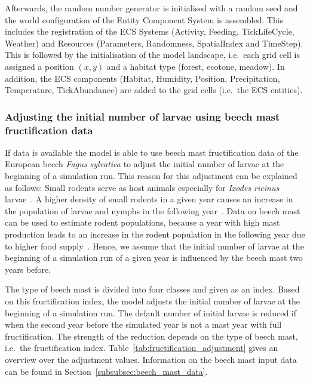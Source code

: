 \documentclass[a4paper, 11pt]{scrartcl}
\begin{document}
Afterwards, the random number generator is initialised with a random seed and the world configuration of the Entity Component System is assembled. This includes the registration of the ECS Systems (Activity, Feeding, TickLifeCycle, Weather) and Resources (Parameters, Randomness, SpatialIndex and TimeStep). This is followed by the initialisation of the model landscape, i.e.\ each grid cell is assigned a position $(x, y)$ and a habitat type (forest, ecotone, meadow). In addition, the ECS components (Habitat, Humidity, Position, Precipitation, Temperature, TickAbundance) are added to the grid cells (i.e.\ the ECS entities).

\subsubsection{Adjusting the initial number of larvae using beech mast fructification data}\label{subsubsec:initial_larvae_with_beech_mast}
If data is available the model is able to use beech mast fructification data of the European beech \textit{Fagus sylvatica} to adjust the initial number of larvae at the beginning of a simulation run. This reason for this adjustment can be explained as follows: Small rodents serve as host animals especially for \textit{Ixodes ricinus} larvae~\parencite{Cayol.2017}. A higher density of small rodents in a given year causes an increase in the population of larvae and nymphs in the following year~\parencite{Brugger.2018}. Data on beech mast can be used to estimate rodent populations, because a year with high mast production leads to an increase in the rodent population in the following year due to higher food supply~\parencite{Clement.2009}. Hence, we assume that the initial number of larvae at the beginning of a simulation run of a given year is influenced by the beech mast two years before.

The type of beech mast is divided into four classes and given as an index. Based on this fructification index, the model adjusts the initial number of larvae at the beginning of a simulation run. The default number of initial larvae is reduced if when the second year before the simulated year is not a mast year with full fructification. The strength of the reduction depends on the type of beech mast, i.e.\ the fructification index. Table~\ref{tab:fructification_adjustment} gives an overview over the adjustment values. Information on the beech mast input data can be found in Section~\ref{subsubsec:beech_mast_data}.
\end{document}
